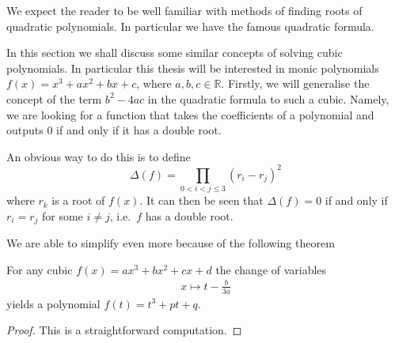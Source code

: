 We expect the reader to be well familiar with methods of
finding roots of quadratic polynomials.
In particular we have the famous quadratic formula.

In this section we shall discuss some similar concepts of solving
cubic polynomials. In particular this thesis will be interested
in monic polynomials $f(x) = x^3 + ax^2 + bx + c$, where $a, b, c \in \mathbb{R}$.
Firstly, we will generalise the concept of the term $b^2 - 4ac$ in
the quadratic formula to such a cubic. Namely, we are looking
for a function that takes the coefficients of a polynomial
and outputs 0 if and only if it has a double root.

An obvious way to do this is to define
\[ \Delta(f) = \prod_{0 < i < j \leq 3}^{} (r_i - r_j)^2 \]
where $r_k$ is a root of $f(x)$. It can then be seen that $\Delta(f) = 0$
if and only if $r_i = r_j$ for some $i \neq j$, i.e.\ $f$ has
a double root.

We are able to simplify even more because of the following theorem
\begin{theorem}
  For any cubic $f(x) = ax^3 + bx^2 + cx + d$ the change of variables
  \begin{align*}
    x \mapsto t - \frac{b}{3a}
  \end{align*}
  yields a polynomial $f(t) = t^3 + pt + q$.
\end{theorem}
\begin{proof}
  This is a straightforward computation.
\end{proof}
